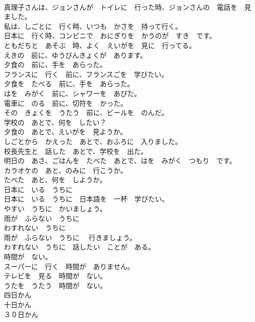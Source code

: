 \documentclass[8pt]{extreport}
\begin{document}
\begin{CJK}{UTF8}{min}
\\	真理子さんは、ジョンさんが　トイレに　行った時、ジョンさんの　電話を　見ました。	
\\	私は、しごとに　行く時、いつも　かさを　持って行く。	
\\	日本に　行く時、コンビニで　おにぎりを　かうのが　すき　です。	
\\	ともだちと　あそぶ　時、よく　えいがを　見に　行ってる。	
\\	えきの　前に、ゆうびんきょくが　あります。	
\\	夕食の　前に、手を　あらった。	
\\	フランスに　行く　前に、フランスごを　学びたい。	
\\	夕食を　たべる　前に、手を　あらった。	
\\	はを　みがく　前に、シャワーを　あびた。	
\\	電車に　のる　前に、切符を　かった。	
\\	その　きょくを　うたう　前に、ビールを　のんだ。	
\\	学校の　あとで、何を　したい？	
\\	夕食の　あとで、えいがを　見ようか。	
\\	しごとから　かえった　あとで、おふろに　入りました。	
\\	校長先生と　話した　あとで、学校を　出た。	
\\	明日の　あさ、ごはんを　たべた　あとで、はを　みがく　つもり　です。	
\\	カラオケの　あと、のみに　行こうか。	
\\	たべた　あと、何を　しようか。	
\\	日本に　いる　うちに	
\\	日本に　いる　うちに　日本語を　一杯　学びたい。	
\\	やすい　うちに　かいましょう。	
\\	雨が　ふらない　うちに	
\\	わすれない　うちに	
\\	雨が　ふらない　うちに 　行きましょう。	
\\	わすれない　うちに　話したい　ことが　ある。	
\\	時間が　ない。	
\\	スーパーに　行く　時間が　ありません。	
\\	テレビを　見る　時間が　ない。	
\\	うたを　うたう　時間が　ない。	
\\	四日かん	
\\	十日かん	
\\	３０日かん	

\end{CJK}
\end{document}
